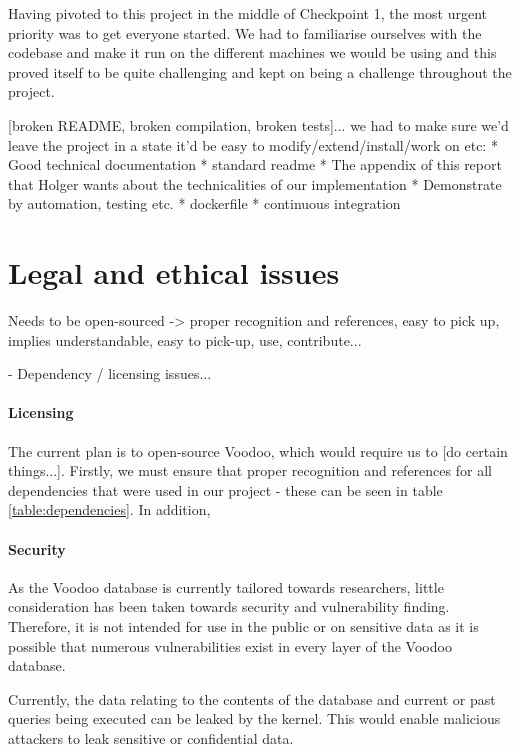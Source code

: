 \begin{enumerate}
Having pivoted to this project in the middle of Checkpoint 1, the most urgent priority was to get everyone started. We had to familiarise ourselves with the codebase and make it run on the different machines we would be using and this proved itself to be quite challenging and kept on being a challenge throughout the project.

[broken README, broken compilation, broken tests]... we had to make sure we'd leave the project in a state it'd be easy to modify/extend/install/work on etc:
* Good technical documentation
  * standard readme
  * The appendix of this report that Holger wants about the technicalities of our implementation
* Demonstrate by automation, testing etc.
  * dockerfile
  * continuous integration
\end{enumerate}

\section{Legal and ethical issues}

Needs to be open-sourced -> proper recognition and references, easy to pick up, implies understandable, easy to pick-up, use, contribute...

- Dependency / licensing issues...

\paragraph{Licensing}

The current plan is to open-source Voodoo, which would require us to [do certain things...]. Firstly, we must ensure that proper recognition and references for all dependencies that were used in our project - these can be seen in table \ref{table:dependencies}. In addition, 

\paragraph{Security}

As the Voodoo database is currently tailored towards researchers, little  consideration has been taken towards security and vulnerability finding. Therefore, it is not intended for use in the public or on sensitive data as it is possible that numerous vulnerabilities exist in every layer of the Voodoo database.

Currently, the data relating to the contents of the database and current or past queries being executed can be leaked by the kernel. This would enable malicious attackers to leak sensitive or confidential data.

